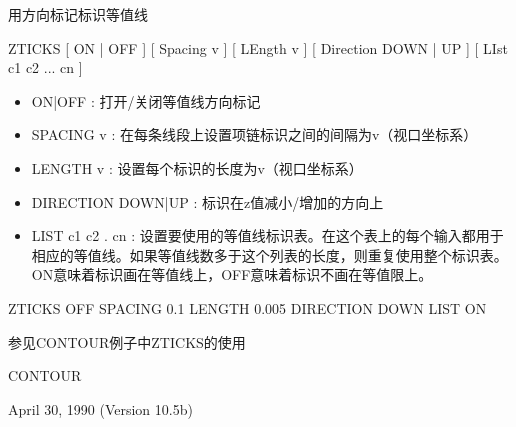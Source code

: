 \label{cmd:zticks}

用方向标记标识等值线

ZTICKS  [ ON | OFF ] [ Spacing v ] [ LEngth v ] [ Direction DOWN | UP ] [ LIst c1 c2 ... cn ]

\begin{itemize}
\item ON|OFF : 打开/关闭等值线方向标记 
\item SPACING v : 在每条线段上设置项链标识之间的间隔为v（视口坐标系） 
\item LENGTH v : 设置每个标识的长度为v（视口坐标系） 
\item DIRECTION DOWN|UP : 标识在z值减小/增加的方向上 
\item LIST c1 c2 . cn : 设置要使用的等值线标识表。在这个表上的每个输入都用于相应的等值线。如果等值线数多于这个列表的长度，则重复使用整个标识表。ON意味着标识画在等值线上，OFF意味着标识不画在等值限上。 
\end{itemize}

ZTICKS  OFF  SPACING 0.1  LENGTH 0.005  DIRECTION DOWN  LIST ON

参见CONTOUR例子中ZTICKS的使用

CONTOUR

April 30, 1990 (Version 10.5b)
